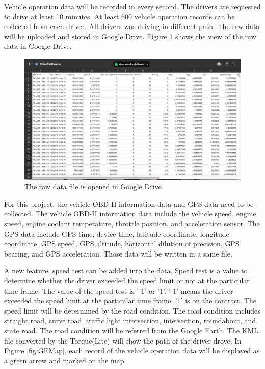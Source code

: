 Vehicle operation data will be recorded in every second. The drivers are requested to drive at least 10 minutes. At least 600 vehicle operation records can be collected from each driver. All drivers was driving in different path. The raw data will be uploaded and stored in Google Drive. Figure \ref{fig:GDfile} shows  the view of the raw data in Google Drive.

\begin{figure}[hbt!]\centering
\includegraphics[width=.75\textwidth]{image/GDfile}
\caption{The raw data file is opened in Google Drive.}
\label{fig:GDfile}
\end{figure}

For this project, the vehicle OBD-II information data and GPS data need to be collected. The vehicle OBD-II information data include the vehicle speed, engine speed, engine coolant temperature, throttle position, and acceleration sensor. The GPS data include GPS time, device time, latitude coordinate, longitude coordinate, GPS speed, GPS altitude, horizontal dilution of precision, GPS bearing, and GPS acceleration. Those data will be written in a same file.

A new feature, speed test can be added into the data. Speed test is a value to determine whether the driver exceeded the speed limit or not at the particular time frame. The value of the speed test is '-1' or '1'. '-1' means the driver exceeded the speed limit at the particular time frame. '1' is on the contrast. The speed limit will be determined by the road condition. The road condition includes straight road, curve road, traffic light intersection, intersection, roundabout, and state road. The road condition will be referred from the Google Earth. The KML file converted by the Torque(Lite) will show the path of the driver drove. In Figure \ref{fig:GEMap}, each record of the vehicle operation data will be displayed as a green arrow and marked on the map. 

